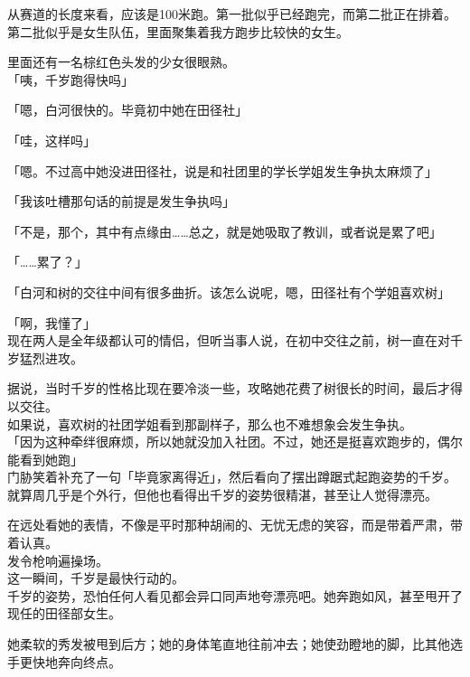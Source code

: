 从赛道的长度来看，应该是100米跑。第一批似乎已经跑完，而第二批正在排着。\\

第二批似乎是女生队伍，里面聚集着我方跑步比较快的女生。

里面还有一名棕红色头发的少女很眼熟。\\

「咦，千岁跑得快吗」

「嗯，白河很快的。毕竟初中她在田径社」

「哇，这样吗」

「嗯。不过高中她没进田径社，说是和社团里的学长学姐发生争执太麻烦了」

「我该吐槽那句话的前提是发生争执吗」

「不是，那个，其中有点缘由……总之，就是她吸取了教训，或者说是累了吧」

「……累了？」

「白河和树的交往中间有很多曲折。该怎么说呢，嗯，田径社有个学姐喜欢树」

「啊，我懂了」\\

现在两人是全年级都认可的情侣，但听当事人说，在初中交往之前，树一直在对千岁猛烈进攻。

据说，当时千岁的性格比现在要冷淡一些，攻略她花费了树很长的时间，最后才得以交往。\\

如果说，喜欢树的社团学姐看到那副样子，那么也不难想象会发生争执。\\

「因为这种牵绊很麻烦，所以她就没加入社团。不过，她还是挺喜欢跑步的，偶尔能看到她跑」\\

门胁笑着补充了一句「毕竟家离得近」，然后看向了摆出蹲踞式起跑姿势的千岁。\\

就算周几乎是个外行，但他也看得出千岁的姿势很精湛，甚至让人觉得漂亮。

在远处看她的表情，不像是平时那种胡闹的、无忧无虑的笑容，而是带着严肃，带着认真。\\

发令枪响遍操场。\\

这一瞬间，千岁是最快行动的。\\

千岁的姿势，恐怕任何人看见都会异口同声地夸漂亮吧。她奔跑如风，甚至甩开了现任的田径部女生。

她柔软的秀发被甩到后方；她的身体笔直地往前冲去；她使劲瞪地的脚，比其他选手更快地奔向终点。\\

